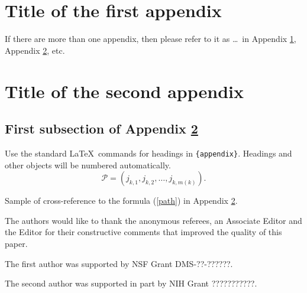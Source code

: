 \documentclass[aihp]{imsart}
\theoremstyle{plain}
\theoremstyle{definition}
\begin{document}
\begin{appendix}
\section{Title of the first appendix}\label{appA}
If there are more than one appendix, then please refer to it
as \ldots\ in Appendix \ref{appA}, Appendix \ref{appB}, etc.

\section{Title of the second appendix}\label{appB}
\subsection{First subsection of Appendix \protect\ref{appB}}

Use the standard \LaTeX\ commands for headings in \verb|{appendix}|.
Headings and other objects will be numbered automatically.
\begin{equation}
\mathcal{P}=(j_{k,1},j_{k,2},\dots,j_{k,m(k)}). \label{path}
\end{equation}

Sample of cross-reference to the formula (\ref{path}) in Appendix \ref{appB}.
\end{appendix}

\begin{acks}[Acknowledgments]
The authors would like to thank the anonymous referees, an Associate
Editor and the Editor for their constructive comments that improved the
quality of this paper.
\end{acks}

\begin{funding}

The first author was supported by NSF Grant DMS-??-??????.

The second author was supported in part by NIH Grant ???????????.
\end{funding}


\end{document}
